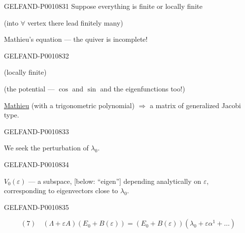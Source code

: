 \begin{GelfandAdjacentEvidence}{GELFAND-P001083}{1}
Suppose everything is finite or locally finite

(into $\forall$ vertex there lead finitely many)

Mathieu’s equation — the quiver is incomplete!
\end{GelfandAdjacentEvidence}
\begin{GelfandAdjacentEvidence}{GELFAND-P001083}{2}


(locally finite)

(the potential — $\cos$ and $\sin$ and the eigenfunctions too!)

\uline{Mathieu} (with a trigonometric polynomial) $\Rightarrow$ a matrix of generalized Jacobi type.
\end{GelfandAdjacentEvidence}
\begin{GelfandAdjacentEvidence}{GELFAND-P001083}{3}


We seek the perturbation of $\lambda_0$.

\end{GelfandAdjacentEvidence}
\begin{GelfandAdjacentEvidence}{GELFAND-P001083}{4}


$V_0(\varepsilon)$ — a subspace, [below: “eigen”] depending analytically on
$\varepsilon$, corresponding to eigenvectors close to $\lambda_0$.
\end{GelfandAdjacentEvidence}
\begin{GelfandAdjacentEvidence}{GELFAND-P001083}{5}


\[
(7)\quad
(\Lambda+\varepsilon A)(E_0+B(\varepsilon))
=(E_0+B(\varepsilon))(\lambda_0+\varepsilon\alpha^1+\ldots)
\]
\end{GelfandAdjacentEvidence}
